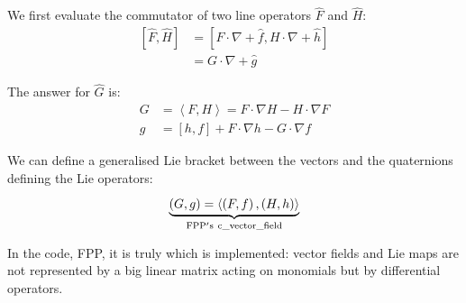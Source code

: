 \documentclass[english,12pt,article]{article} %
\begin{document}
{{{We first evaluate the commutator of two line operators $\widehat{F}$ and  $\widehat{H}$:
%
\begin{align} \left[{\widehat{F},\widehat{H}}\right]&=\left[{F\cdot \nabla +\hat{f} ,H\cdot \nabla +\hat{h} }\right]\nonumber \\
 &=G\cdot \nabla +\hat{g} \label{hopc}\end{align}
 
The answer for $\widehat{G}$ is: 
%
\begin{align} G&= \left\langle{F,H}\right\rangle=
F\cdot \nabla H-H\cdot \nabla F\nonumber \\
 g&=\left[{h,f}\right]+F\cdot \nabla h-G\cdot \nabla f \label{liebra}\end{align}


We can define a generalised Lie bracket between the vectors and the quaternions defining the Lie operators: 
%
\begin{align}\underbrace{\left({G,g}\right)=\left\langle{\left({F,f}\right),\left({H,h}\right)}\right\rangle}\limits_{{\rm F}{\rm P}{\rm P}'{\rm s}~{\rm c}\_{\rm v}{\rm e}{\rm c}{\rm t}{\rm o}{\rm r}\_{\rm f}{\rm i}{\rm e}{\rm l}{\rm d} }^{}\label{liebrafpp}\end{align}




In the code, FPP, it is truly  which is implemented: vector fields and Lie maps are not represented by a big linear matrix acting on monomials but by  differential operators.

}}}
\end{document}
